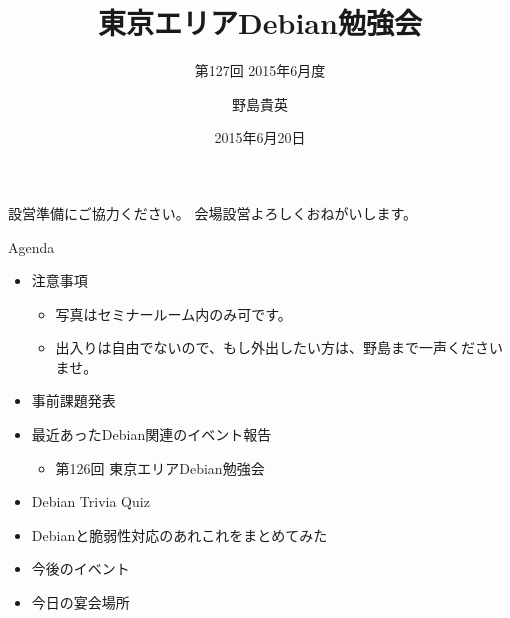 \title{東京エリアDebian勉強会}
\subtitle{第127回 2015年6月度}
\author{野島貴英}
\date{2015年6月20日}



\begin{frame}
\titlepage{}
\end{frame}

\begin{frame}{設営準備にご協力ください。}
会場設営よろしくおねがいします。
\end{frame}

\begin{frame}{Agenda}
 \begin{minipage}[t]{0.45\hsize}
  \begin{itemize}
   \item 注意事項
	 \begin{itemize}
	  \item 写真はセミナールーム内のみ可です。
          \item 出入りは自由でないので、もし外出したい方は、野島まで一声くださいませ。
	 \end{itemize}
   \item 事前課題発表
  \end{itemize}
 \end{minipage} 
 \begin{minipage}[t]{0.45\hsize}
  \begin{itemize}
   \item 最近あったDebian関連のイベント報告
	 \begin{itemize}
	 \item 第126回 東京エリアDebian勉強会
	 \end{itemize}
   \item Debian Trivia Quiz
   \item Debianと脆弱性対応のあれこれをまとめてみた
   \item 今後のイベント
   \item 今日の宴会場所
  \end{itemize}
 \end{minipage}
\end{frame}

